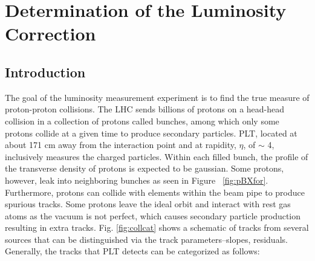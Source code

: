 \chapter{Determination of the Luminosity Correction} \label{ch:Correction}

\section{Introduction} \label{sec:corrIntro}
The goal of the luminosity measurement experiment is to find the true measure of proton-proton collisions. The LHC sends billions of protons on a head-head collision in a collection of protons called bunches, among which only some protons collide at a given time to produce secondary particles. PLT, located at about 171 cm away from the interaction point and at rapidity, $\eta$,  of $\sim$ 4, inclusively measures the charged particles. 
Within each filled bunch, the profile of the transverse density of protons is expected to be gaussian. Some protons, however, leak into neighboring bunches as seen in Figure ~\ref{fig:pBXfor}. Furthermore, protons can collide with elements within the beam pipe to produce spurious tracks. Some protons leave the ideal orbit and interact with rest gas atoms as the vacuum is not perfect, which causes secondary particle production resulting in extra tracks. 
Fig. \ref{fig:collcat} shows a schematic of tracks from several sources that can be distinguished via the track parameters--slopes, residuals. Generally, the tracks that PLT detects can be categorized as follows:


